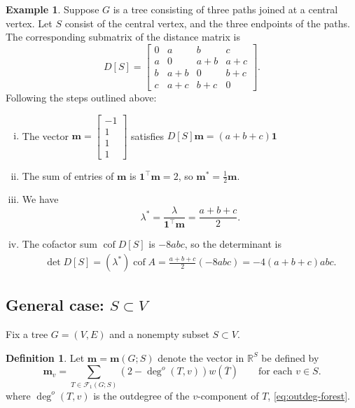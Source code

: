 \documentclass{amsart}
\theoremstyle{definition}
\newtheorem{dfn}[thm]{Definition}
\newtheorem{eg}[thm]{Example}
\newcommand{\RR}{\mathbb{R}}
\newcommand{\bone}{\mathbf{1}}
\newcommand{\boldm}{\mathbf{m}}
\newcommand{\tr}{\intercal}
\DeclareMathOperator{\cof}{cof}
\newcommand{\trees}{\mathcal{F}_1}
\newcommand{\degout}{\deg^o}
\begin{document}
\begin{eg}
Suppose $G$ is a tree consisting of three paths joined at a central vertex.
Let $S$ consist of the central vertex, and the three endpoints of the paths. 
The corresponding submatrix of the distance matrix is
$$
D[S] = \begin{bmatrix}
0 & a & b & c \\
a & 0 & a + b & a + c \\
b & a + b & 0 & b + c \\
c & a + c & b + c & 0
\end{bmatrix}.
$$
Following the steps outlined above:
\begin{enumerate}[(i)]
\item 
The vector $\boldm = \begin{bmatrix} -1 \\ 1 \\ 1 \\ 1 \end{bmatrix}$ satisfies
$
D[S] \boldm = (a+b+c) \mathbf{1}
$

\item 
The sum of entries of $\boldm$ is $\mathbf{1}^\tr \boldm = 2$,
so $\boldm^* = \frac12 \boldm$.

\item 
We have 
\[
\lambda^* = \frac{\lambda}{\bone^\tr\boldm} = \frac{a + b + c}{2} .
\]

\item 
The cofactor sum  
$\cof D[S]$ is $-8 abc$,
so the determinant is
\begin{align*}
\det D[S] 
= (\lambda^*) \cof A
= \frac{a + b + c}{2} (-8 abc)
= -4(a + b + c) abc.
\end{align*}
\end{enumerate}
\end{eg}

\subsection{General case: $S \subset V$}
Fix a tree $G = (V,E)$ and a nonempty subset $S \subset V$.
\begin{dfn}
\label{dfn:m-vector}
Let $\boldm = \boldm(G;S)$ denote the vector in $\RR^S$ be defined by
\begin{equation}
\label{eq:m-vector}
\boldm_v =  \sum_{T \in \trees(G;S)} (2 - \degout(T,v)) w(\overline{T})
\qquad\text{for each }v \in S.
\end{equation}
where $\degout(T,v)$ is the outdegree of the $v$-component of $T$, \eqref{eq:outdeg-forest}.
\end{dfn}
\end{document}
